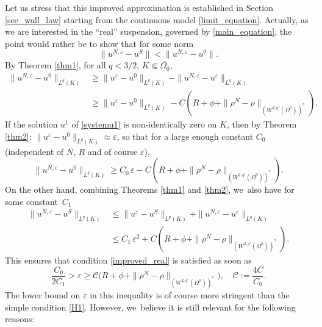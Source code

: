 \documentclass[JEP,XML,SOM,Unicode,NoEqCountersInSection,published]{cedram}
\theoremstyle{plain}
\theoremstyle{definition}
\let\eps\varepsilon
\begin{document}
Let us stress that this improved approximation is established in Section \ref{sec_wall_law} starting from the continuous model \eqref{limit_equation}. Actually, as we are interested in the ``real'' suspension, governed by \eqref{main_equation}, the point would rather be to show that for some norm
\begin{equation} \label{improved_real}
\|u^{N,\eps} - u^S\| < \|u^{N,\eps} - u^0\|.
\end{equation}
By Theorem \ref{thm1}, for all $q < 3/2$, $K \Subset \overline{\Omega_0}$,
\begin{align*} \|u^{N,\eps} - u^0\|_{L^q(K)} &\ge \|u^\eps - u^0\|_{L^q(K)} - \|u^{N,\eps} - u^\eps\|_{L^q(K)}\\
&\ge \|u^\eps - u^0\|_{L^q(K)} - C (R+\phi + \|\rho^N-\rho\|_{(W^{2,q'}(\Omega^0))^*}).
\end{align*}
If the solution $u^1$ of \eqref{systemu1} is non-identically zero on $K$, then by Theorem \ref{thm2}: \hbox{$\|u^\eps - u^0\|_{L^q(K)} \approx \eps$}, so that for a large enough constant $C_0$ (independent of $N$, $R$ and of course $\eps$),
\[
\|u^{N,\eps} - u^0\|_{L^q(K)} \ge C_0 \, \eps - C (R+\phi + \|\rho^N-\rho\|_{(W^{2,q'}(\Omega^0))^*}).
\]
On the other hand, combining Theorems \ref{thm1} and \ref{thm2}, we~also have for some constant~$C_1$
\begin{align*}
\|u^{N,\eps} - u^S\|_{L^q(K)} &\le \|u^\eps - u^S\|_{L^q(K)} + \|u^{N,\eps} - u^\eps\|_{L^q(K)}\\
&\le C_1\,\eps^2 + C (R+\phi + \|\rho^N-\rho\|_{(W^{2,q'}(\Omega^0))^*}).
\end{align*}
This ensures that condition \eqref{improved_real} is satisfied as soon as
\begin{equation} \label{stronger_assumption_size}
\frac{C_0}{2 C_1} > \eps \ge \mathcal{C} \big(R+ \phi + \|\rho^N-\rho\|_{(W^{2,q'}(\Omega^0))^*} \big), \quad \mathcal{C} := \frac{4C}{C_0}.
\end{equation}
The lower bound on $\eps$ in this inequality is of course more stringent than the simple condition \eqref{H1}. However, we~believe it is still relevant for the following reasons:
\end{document}
